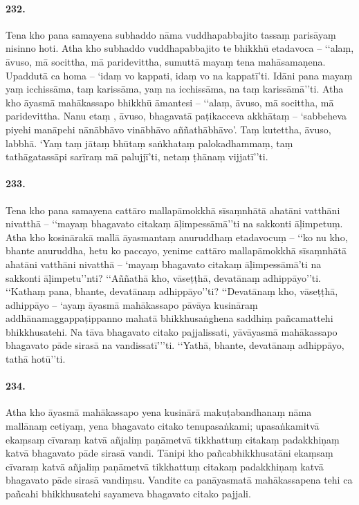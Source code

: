 \paragraph{232.} Tena kho pana samayena subhaddo nāma vuddhapabbajito tassaṃ parisāyaṃ nisinno hoti. Atha kho subhaddo vuddhapabbajito te bhikkhū etadavoca – ‘‘alaṃ, āvuso, mā socittha, mā paridevittha, sumuttā mayaṃ tena mahāsamaṇena. Upaddutā ca homa – ‘idaṃ vo kappati, idaṃ vo na kappatī’ti. Idāni pana mayaṃ yaṃ icchissāma, taṃ karissāma, yaṃ na icchissāma, na taṃ karissāmā’’ti. Atha kho āyasmā mahākassapo bhikkhū āmantesi – ‘‘alaṃ, āvuso, mā socittha, mā paridevittha. Nanu etaṃ , āvuso, bhagavatā paṭikacceva akkhātaṃ – ‘sabbeheva piyehi manāpehi nānābhāvo vinābhāvo aññathābhāvo’. Taṃ kutettha, āvuso, labbhā. ‘Yaṃ taṃ jātaṃ bhūtaṃ saṅkhataṃ palokadhammaṃ, taṃ tathāgatassāpi sarīraṃ mā palujjī’ti, netaṃ ṭhānaṃ vijjatī’’ti.

\paragraph{233.} Tena kho pana samayena cattāro mallapāmokkhā sīsaṃnhātā ahatāni vatthāni nivatthā – ‘‘mayaṃ bhagavato citakaṃ āḷimpessāmā’’ti na sakkonti āḷimpetuṃ. Atha kho kosinārakā mallā āyasmantaṃ anuruddhaṃ etadavocuṃ – ‘‘ko nu kho, bhante anuruddha, hetu ko paccayo, yenime cattāro mallapāmokkhā sīsaṃnhātā ahatāni vatthāni nivatthā – ‘mayaṃ bhagavato citakaṃ āḷimpessāmā’ti na sakkonti āḷimpetu’’nti? ‘‘Aññathā kho, vāseṭṭhā, devatānaṃ adhippāyo’’ti. ‘‘Kathaṃ pana, bhante, devatānaṃ adhippāyo’’ti? ‘‘Devatānaṃ kho, vāseṭṭhā, adhippāyo – ‘ayaṃ āyasmā mahākassapo pāvāya kusināraṃ addhānamaggappaṭippanno mahatā bhikkhusaṅghena saddhiṃ pañcamattehi bhikkhusatehi. Na tāva bhagavato citako pajjalissati, yāvāyasmā mahākassapo bhagavato pāde sirasā na vandissatī’’’ti. ‘‘Yathā, bhante, devatānaṃ adhippāyo, tathā hotū’’ti.

\paragraph{234.} Atha kho āyasmā mahākassapo yena kusinārā makuṭabandhanaṃ nāma mallānaṃ cetiyaṃ, yena bhagavato citako tenupasaṅkami; upasaṅkamitvā ekaṃsaṃ cīvaraṃ katvā añjaliṃ paṇāmetvā tikkhattuṃ citakaṃ padakkhiṇaṃ katvā bhagavato pāde sirasā vandi. Tānipi kho pañcabhikkhusatāni ekaṃsaṃ cīvaraṃ katvā añjaliṃ paṇāmetvā tikkhattuṃ citakaṃ padakkhiṇaṃ katvā bhagavato pāde sirasā vandiṃsu. Vandite ca panāyasmatā mahākassapena tehi ca pañcahi bhikkhusatehi sayameva bhagavato citako pajjali.

